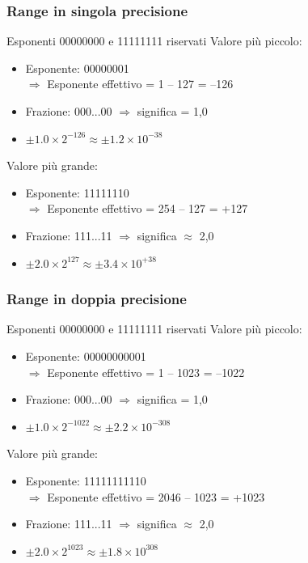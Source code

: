\documentclass[12pt,a4paper]{article}
\begin{document}
\subsubsection{Range in singola precisione}
Esponenti 00000000 e 11111111 riservati
Valore più piccolo:
\begin{itemize}
\item Esponente: 00000001\\
	$\Rightarrow $ Esponente effettivo = 1 – 127 = –126
\item Frazione: 000...00 $\Rightarrow$ significa = 1,0
\item $\pm 1.0 \times 2^{-126} \approx \pm 1.2 \times 10^{-38}$
\end{itemize}
Valore più grande:
\begin{itemize}
\item Esponente: 11111110\\
	$\Rightarrow $ Esponente effettivo = 254 – 127 = +127
\item Frazione: 111...11 $\Rightarrow$ significa $\approx$ 2,0
\item $\pm 2.0 \times 2^{127} \approx \pm 3.4 \times 10^{+38}$
\end{itemize}

\subsubsection{Range in doppia precisione}
Esponenti 00000000 e 11111111 riservati
Valore più piccolo:
\begin{itemize}
\item Esponente: 00000000001\\
	$\Rightarrow $ Esponente effettivo = 1 – 1023 = –1022
\item Frazione: 000...00 $\Rightarrow$ significa = 1,0
\item $\pm 1.0 \times 2^{-1022} \approx \pm 2.2 \times 10^{-308}$
\end{itemize}
Valore più grande:
\begin{itemize}
\item Esponente: 11111111110\\
	$\Rightarrow $ Esponente effettivo = 2046 – 1023 = +1023
\item Frazione: 111...11 $\Rightarrow$ significa $\approx$ 2,0
\item $\pm 2.0 \times 2^{1023} \approx \pm 1.8 \times 10^{308}$
\end{itemize}
\end{document}
